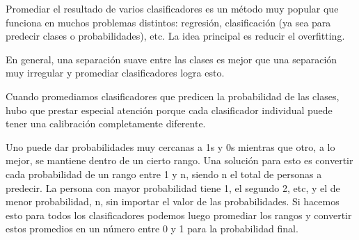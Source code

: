 \documentclass[a4paper ,12pt]{article}
\begin{document}
Promediar el resultado de varios clasificadores es un método muy popular que
funciona en muchos problemas distintos: regresión, clasificación (ya sea para
predecir clases o probabilidades), etc. La idea principal es reducir el overfitting.

En general, una separación suave entre las clases es mejor que una separación
muy irregular y promediar clasificadores logra esto.

Cuando promediamos clasificadores que predicen la probabilidad de las clases, hubo
que prestar especial atención porque cada clasificador individual puede tener una calibración completamente diferente. 

Uno puede dar probabilidades muy cercanas a 1s y 0s mientras que otro, a lo mejor, se mantiene dentro de un cierto rango.
Una solución para esto es convertir cada probabilidad de un rango entre 1 y n, siendo n el total de personas a predecir. La persona con mayor probabilidad tiene 1,
el segundo 2, etc, y el de menor probabilidad, n, sin importar el valor de las probabilidades. Si hacemos esto para todos los clasificadores podemos luego
promediar los rangos y convertir estos promedios en un número entre 0 y 1 para la probabilidad final.


\newpage
\end{document}
